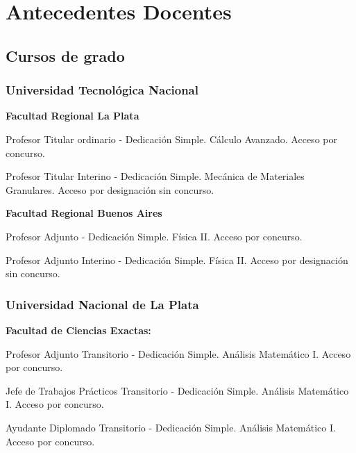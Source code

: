 \section{Antecedentes Docentes}

\subsection{Cursos de grado}

\subsubsection{Universidad Tecnológica Nacional}

\textbf{Facultad Regional La Plata}

\begin{timeline}
 Profesor Titular ordinario - Dedicación Simple. Cálculo Avanzado. Acceso por concurso.

 Profesor Titular Interino - Dedicación Simple. Mecánica de Materiales Granulares. Acceso por designación sin concurso.
\end{timeline}

\textbf{Facultad Regional Buenos Aires}

\begin{timeline}
 Profesor Adjunto - Dedicación Simple. Física II. Acceso por concurso.

 Profesor Adjunto Interino - Dedicación Simple. Física II. Acceso por designación sin concurso.
\end{timeline}

\subsubsection{Universidad Nacional de La Plata}
  
\textbf{Facultad de Ciencias Exactas:}
 
\begin{timeline}
 Profesor Adjunto Transitorio - Dedicación Simple. Análisis Matemático I. Acceso por concurso.

 Jefe de Trabajos Prácticos Transitorio - Dedicación Simple. Análisis Matemático I. Acceso por concurso.

 Ayudante Diplomado Transitorio - Dedicación Simple. Análisis Matemático I. Acceso por concurso.
\end{timeline}

